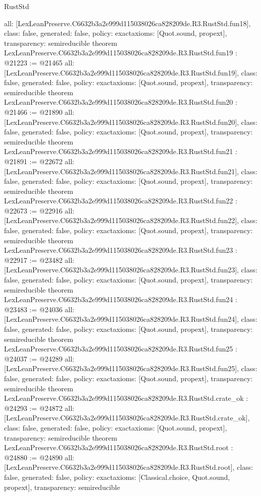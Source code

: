 \begin{lexlean}{RustStd}
\begin{coremodule}
{  all: [LexLeanPreserve.C6632b3a2e999d115038026ca828209de.R3.RustStd.fun18],
  class: false,
  generated: false,
  policy: exact{axioms: [Quot.sound, propext]},
  transparency: semireducible
}
theorem LexLeanPreserve.C6632b3a2e999d115038026ca828209de.R3.RustStd.fun19 : @21223 := @21465 {
  all: [LexLeanPreserve.C6632b3a2e999d115038026ca828209de.R3.RustStd.fun19],
  class: false,
  generated: false,
  policy: exact{axioms: [Quot.sound, propext]},
  transparency: semireducible
}
theorem LexLeanPreserve.C6632b3a2e999d115038026ca828209de.R3.RustStd.fun20 : @21466 := @21890 {
  all: [LexLeanPreserve.C6632b3a2e999d115038026ca828209de.R3.RustStd.fun20],
  class: false,
  generated: false,
  policy: exact{axioms: [Quot.sound, propext]},
  transparency: semireducible
}
theorem LexLeanPreserve.C6632b3a2e999d115038026ca828209de.R3.RustStd.fun21 : @21891 := @22672 {
  all: [LexLeanPreserve.C6632b3a2e999d115038026ca828209de.R3.RustStd.fun21],
  class: false,
  generated: false,
  policy: exact{axioms: [Quot.sound, propext]},
  transparency: semireducible
}
theorem LexLeanPreserve.C6632b3a2e999d115038026ca828209de.R3.RustStd.fun22 : @22673 := @22916 {
  all: [LexLeanPreserve.C6632b3a2e999d115038026ca828209de.R3.RustStd.fun22],
  class: false,
  generated: false,
  policy: exact{axioms: [Quot.sound, propext]},
  transparency: semireducible
}
theorem LexLeanPreserve.C6632b3a2e999d115038026ca828209de.R3.RustStd.fun23 : @22917 := @23482 {
  all: [LexLeanPreserve.C6632b3a2e999d115038026ca828209de.R3.RustStd.fun23],
  class: false,
  generated: false,
  policy: exact{axioms: [Quot.sound, propext]},
  transparency: semireducible
}
theorem LexLeanPreserve.C6632b3a2e999d115038026ca828209de.R3.RustStd.fun24 : @23483 := @24036 {
  all: [LexLeanPreserve.C6632b3a2e999d115038026ca828209de.R3.RustStd.fun24],
  class: false,
  generated: false,
  policy: exact{axioms: [Quot.sound, propext]},
  transparency: semireducible
}
theorem LexLeanPreserve.C6632b3a2e999d115038026ca828209de.R3.RustStd.fun25 : @24037 := @24289 {
  all: [LexLeanPreserve.C6632b3a2e999d115038026ca828209de.R3.RustStd.fun25],
  class: false,
  generated: false,
  policy: exact{axioms: [Quot.sound, propext]},
  transparency: semireducible
}
theorem LexLeanPreserve.C6632b3a2e999d115038026ca828209de.R3.RustStd.crate_ok : @24293 := @24872 {
  all: [LexLeanPreserve.C6632b3a2e999d115038026ca828209de.R3.RustStd.crate_ok],
  class: false,
  generated: false,
  policy: exact{axioms: [Quot.sound, propext]},
  transparency: semireducible
}
theorem LexLeanPreserve.C6632b3a2e999d115038026ca828209de.R3.RustStd.root : @24880 := @24890 {
  all: [LexLeanPreserve.C6632b3a2e999d115038026ca828209de.R3.RustStd.root],
  class: false,
  generated: false,
  policy: exact{axioms: [Classical.choice, Quot.sound, propext]},
  transparency: semireducible
}


\end{coremodule}
\end{lexlean}

